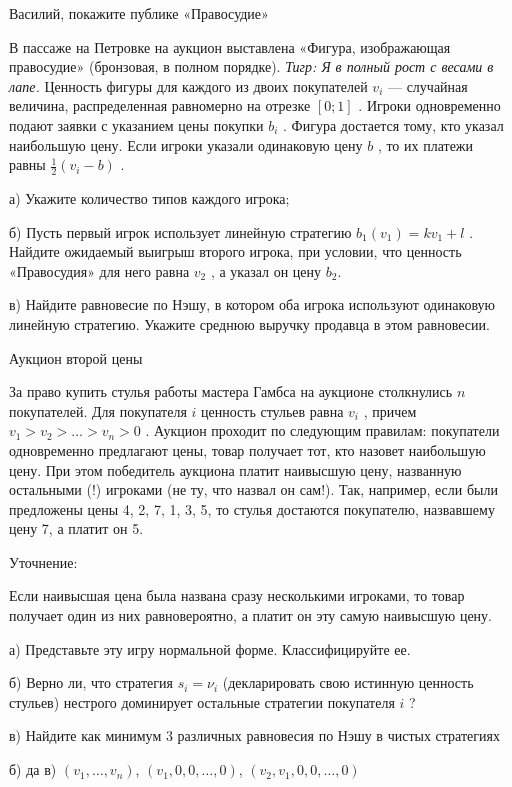\begin{problem}
 Василий, покажите публике «Правосудие»\par
В пассаже на Петровке на аукцион выставлена «Фигура, изображающая правосудие» (бронзовая, в полном порядке). {\it Тигр: Я в полный рост с весами в лапе.} Ценность фигуры для каждого из двоих покупателей  $v_{i} $  — случайная величина, распределенная равномерно на отрезке  $\left[0;1\right]$ . Игроки одновременно подают заявки с указанием цены покупки  $b_{i} $ . Фигура достается тому, кто указал наибольшую цену. Если игроки указали одинаковую цену  $b$ , то их платежи равны  $\frac{1}{2} \left(v_{i} -b\right)$ .\par
а)	Укажите количество типов каждого игрока;\par
б)	Пусть первый игрок использует линейную стратегию  $b_{1} \left(v_{1} \right)=kv_{1} +l$ . Найдите ожидаемый выигрыш второго игрока, при условии, что ценность «Правосудия» для него равна  $v_{2} $ , а указал он цену  $b_{2} $.\par
в)	Найдите равновесие по Нэшу, в котором оба игрока используют одинаковую линейную стратегию. Укажите среднюю выручку продавца в этом равновесии.\par



\begin{sol}

\end{sol}
\end{problem}




\begin{problem}
 Аукцион второй цены\par
За право купить стулья работы мастера Гамбса на аукционе столкнулись  $n$ покупателей. Для покупателя  $i$ ценность стульев равна  $v_{i} $ , причем  $v_{1} >v_{2} >\ldots >v_{n} >0$ . Аукцион проходит по следующим правилам: покупатели одновременно предлагают цены, товар получает тот, кто назовет наибольшую цену. При этом победитель аукциона платит наивысшую цену, названную остальными (!) игроками (не ту, что назвал он сам!). Так, например, если были предложены цены 4, 2, 7, 1, 3, 5, то стулья достаются покупателю, назвавшему цену 7, а платит он 5.\par
Уточнение: \par
Если наивысшая цена была названа сразу несколькими игроками, то товар получает один из них равновероятно, а платит он эту самую наивысшую цену. \par
а) Представьте эту игру нормальной форме. Классифицируйте ее.\par
б) Верно ли, что стратегия  $s_{i} =\nu _{i} $  (декларировать свою истинную ценность стульев) нестрого доминирует остальные стратегии покупателя $i$ ?\par
в) Найдите как минимум 3 различных равновесия по Нэшу в чистых стратегиях



\begin{sol}
б) да в) $(v_{1},\ldots , v_{n})$, $(v_{1},0,0,\ldots ,0)$, $(v_{2},v_{1},0,0,\ldots ,0)$
\end{sol}
\end{problem}




